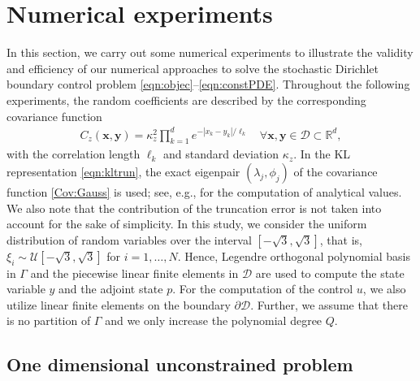 \documentclass[a4paper,10pt]{article}
\newcommand{\cD}{{\mathcal{D}}}
\numberwithin{theorem}{section}
\begin{document}


\section{Numerical experiments}\label{sec:numeric} 

In this section, we carry out some numerical experiments to illustrate the validity and efficiency of our numerical approaches to solve the stochastic Dirichlet boundary control problem \eqref{eqn:objec}--\eqref{eqn:constPDE}. Throughout the following experiments, the random coefficients are described by the corresponding covariance function 
\begin{align}\label{Cov:Gauss}
	C_{z} (\boldsymbol{x},\boldsymbol{y}) = \kappa^2_{z} \prod_{k=1}^{d}  e^{-\left| x_k -y_k \right|/\ell_k } \quad \forall \boldsymbol{x},\boldsymbol{y} \in \mathcal{D} \subset \mathbb{R}^d,
\end{align}
with the  correlation length $\ell_k$ and standard deviation $\kappa_z$. In the KL representation \eqref{eqn:kltrun}, the exact eigenpair $(\lambda_j, \phi_j)$ of the covariance 
function \eqref{Cov:Gauss} is used; see, e.g., \cite{GJLord_CEPowell_TShardlow_2014} for the  computation of analytical values. We also note that the contribution of the 
truncation error is not taken into account for the sake of simplicity. In this study,  we consider the uniform distribution of random variables over the interval
$[-\sqrt{3},\sqrt{3}]$, that is,  $ \xi_i \sim \mathcal{U}[-\sqrt{3},\sqrt{3}]$ for $i=1,\ldots, N$.  Hence, Legendre orthogonal 
polynomial basis in $\Gamma$ and the piecewise linear finite elements in $\mathcal{\cD}$ are used to compute the state variable $y$ and the adjoint state $p$. For the 
computation of the control $u$, we also utilize linear finite elements on the boundary $\partial \mathcal{\cD}$. Further, we assume that there is no partition of $\Gamma$ and we only increase the polynomial degree $Q$.

\subsection{One dimensional unconstrained problem}
\label{sec:1d_example}
\end{document}
